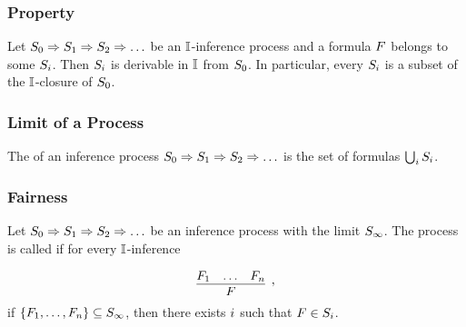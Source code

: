 
	   \begin{frame}\frametitle{Property}

  Let ${S_0 \Rightarrow S_1 \Rightarrow S_2 \Rightarrow \ldots}$ be an ${\mathbb{I}}$-inference process
  and a formula ${F}$ belongs to some ${S_i}$. Then ${S_i}$ is derivable in
  ${\mathbb{I}}$ from ${S_0}$. In particular, every ${S_i}$ is a subset of the
  ${\mathbb{I}}$-closure of ${S_0}$.


                           \end{frame}


	   \begin{frame}\frametitle{Limit of a Process}

The  of an inference process
${S_0 \Rightarrow S_1 \Rightarrow S_2 \Rightarrow \ldots}$
is the set of formulas ${\bigcup_i S_i}$.

\medskip


\bigskip


\bigskip


                           \end{frame}



                           
	   \begin{frame}\frametitle{Fairness}

  Let ${S_0 \Rightarrow S_1 \Rightarrow S_2 \Rightarrow \ldots}$ be an inference process with
  the limit ${S_\infty}$. The process 
  is called  if for every 
  ${\mathbb{I}}$-inference

    \[\M{
      \infer[,]{F}{F_1 & \ldots & F_n}
    }\]
  if ${{\{{F_{1},\ldots,F_{n}}\}} \subseteq S_\infty}$, then
  there exists ${i}$ such that ${F \in S_i}$.


                           \end{frame}

